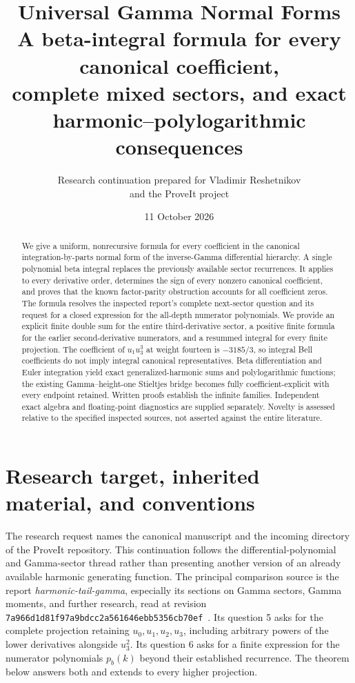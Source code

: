 \documentclass[11pt]{article}
\title{\textbf{Universal Gamma Normal Forms}\\[6pt]\large A beta-integral formula for every canonical coefficient,\\complete mixed sectors, and exact harmonic--polylogarithmic consequences}
\author{Research continuation prepared for Vladimir Reshetnikov\\and the ProveIt project}
\date{11 October 2026}
\numberwithin{equation}{section}
\theoremstyle{definition}\newtheorem{definition}[theorem]{Definition}
\theoremstyle{remark}\newtheorem{remark}[theorem]{Remark}
\newcommand{\pin}{\texttt{7a966d1d81f97a9bdcc2a561646ebb5356cb70ef}}
\begin{document}
\maketitle
\begin{abstract}
We give a uniform, nonrecursive formula for every coefficient in the canonical integration-by-parts normal form of the inverse-Gamma differential hierarchy. A single polynomial beta integral replaces the previously available sector recurrences. It applies to every derivative order, determines the sign of every nonzero canonical coefficient, and proves that the known factor-parity obstruction accounts for all coefficient zeros. The formula resolves the inspected report's complete next-sector question and its request for a closed expression for the all-depth numerator polynomials. We provide an explicit finite double sum for the entire third-derivative sector, a positive finite formula for the earlier second-derivative numerators, and a resummed integral for every finite projection. The coefficient of $u_1u_3^3$ at weight fourteen is $-3185/3$, so integral Bell coefficients do not imply integral canonical representatives. Beta differentiation and Euler integration yield exact generalized-harmonic sums and polylogarithmic functions; the existing Gamma--height-one Stieltjes bridge becomes fully coefficient-explicit with every endpoint retained. Written proofs establish the infinite families. Independent exact algebra and floating-point diagnostics are supplied separately. Novelty is assessed relative to the specified inspected sources, not asserted against the entire literature.
\end{abstract}
\tableofcontents
\clearpage

\section{Research target, inherited material, and conventions}
The research request names the canonical manuscript and the incoming directory of the ProveIt repository. This continuation follows the differential-polynomial and Gamma-sector thread rather than presenting another version of an already available harmonic generating function. The principal comparison source is the report \emph{harmonic-tail-gamma}, especially its sections on Gamma sectors, Gamma moments, and further research, read at revision \pin\ \cite{repo,sector}. Its question 5 asks for the complete projection retaining $u_0,u_1,u_2,u_3$, including arbitrary powers of the lower derivatives alongside $u_3^2$. Its question 6 asks for a finite expression for the numerator polynomials $p_b(k)$ beyond their established recurrence. The theorem below answers both and extends to every higher projection.
\end{document}
